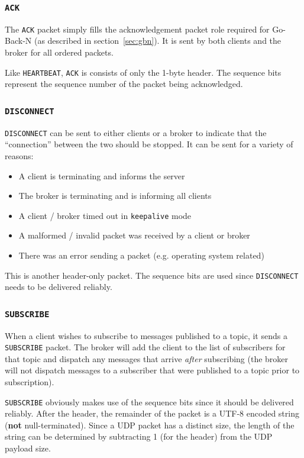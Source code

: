 \documentclass[a4paper]{article}
\numberwithin{figure}{section}
\numberwithin{table}{section}
\newcommand{\mi}{\mintinline}
\begin{document}
\subsubsection{\mi{c}{ACK}}
The \mi{c}{ACK} packet simply fills the acknowledgement packet role required for Go-Back-N (as described in section~\ref{sec:gbn}). It is sent by both clients and the broker for all ordered packets.

Like \mi{c}{HEARTBEAT}, \mi{c}{ACK} is consists of only the 1-byte header. The sequence bits represent the sequence number of the packet being acknowledged.

\subsubsection{\mi{c}{DISCONNECT}}
\mi{c}{DISCONNECT} can be sent to either clients or a broker to indicate that the ``connection'' between the two should be stopped. It can be sent for a variety of reasons:
\begin{itemize}
	\item A client is terminating and informs the server
	\item The broker is terminating and is informing all clients
	\item A client / broker timed out in \mi{c}{keepalive} mode
	\item A malformed / invalid packet was received by a client or broker
	\item There was an error sending a packet (e.g. operating system related)
\end{itemize}

This is another header-only packet. The sequence bits are used since \mi{c}{DISCONNECT} needs to be delivered reliably.

\subsubsection{\mi{c}{SUBSCRIBE}}
When a client wishes to subscribe to messages published to a topic, it sends a \mi{c}{SUBSCRIBE} packet. The broker will add the client to the list of subscribers for that topic and dispatch any messages that arrive \textit{after} subscribing (the broker will not dispatch messages to a subscriber that were published to a topic prior to subscription).

\medskip
\mi{c}{SUBSCRIBE} obviously makes use of the sequence bits since it should be delivered reliably. After the header, the remainder of the packet is a UTF-8 encoded string (\textbf{not} null-terminated). Since a UDP packet has a distinct size, the length of the string can be determined by subtracting 1 (for the header) from the UDP payload size.
\end{document}
